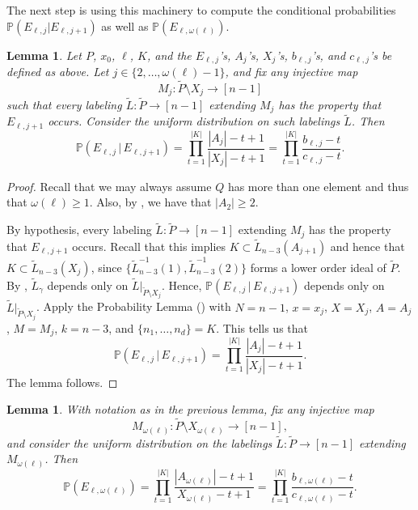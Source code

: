 \documentclass[11pt]{amsart}
\newtheorem{lemma}[thm]{Lemma}
\theoremstyle{definition}
\newcommand{\Prob}{\mathbb{P}}
\newcommand{\inverse}{^{-1}}
\begin{document}
The next step is using this machinery to compute the conditional probabilities $ \Prob(E_{\ell, j}|E_{\ell, j+1}) $ as well as $ \Prob(E_{\ell,\omega(\ell)}) $.
\begin{lemma}\label{conditional helper}
	Let $ P $, $ x_0 $, $ \ell $, $ K $, and the $ E_{\ell,j} $'s, $ A_j $'s, $ X_j $'s, $ b_{\ell,j} $'s, and $ c_{\ell,j} $'s be defined as above. Let $ j\in\{2,\ldots,\omega(\ell)-1\} $, and fix any injective map \[M_j:\tilde{P}\setminus X_j\to[n-1]\] such that every labeling $ \tilde{L}:\tilde{P}\to[n-1] $ extending $ M_j $ has the property that $ E_{\ell,j+1} $ occurs. Consider the uniform distribution on such labelings $ \tilde{L} $. Then \[\Prob(E_{\ell,j}\,|\,E_{\ell,j+1})=\prod_{t=1}^{|K|}\frac{|A_j|-t+1}{|X_j|-t+1}=\prod_{t=1}^{|K|}\frac{b_{\ell,j}-t}{c_{\ell,j}-t}.\]
\end{lemma}
\begin{proof}
	Recall that we may always assume $ Q $ has more than one element and thus that $ \omega(\ell)\geq1 $. Also, by , we have that $ |A_2|\geq2 $. 
	
	By hypothesis, every labeling $ \tilde{L}:\tilde{P}\to[n-1] $ extending $ M_j $ has the property that $ E_{\ell,j+1} $ occurs. Recall that this implies $ K\subset\tilde{L}_{n-3}(A_{j+1}) $ and hence that $ K\subset\tilde{L}_{n-3}(X_j) $, since $ \{\tilde{L}_{n-3}\inverse(1),\tilde{L}_{n-3}\inverse(2)\} $ forms a lower order ideal of $ \tilde{P} $. By , $ \tilde{L}_{\gamma} $ depends only on $ \tilde{L}|_{\tilde{P}\setminus X_j} $. Hence, $ \Prob(E_{\ell,j}\,|\,E_{\ell,j+1}) $ depends only on $ \tilde{L}|_{\tilde{P}\setminus X_j} $.  Apply the Probability Lemma () with $ N=n-1 $, $ x=x_j $, $ X=X_j $, $ A=A_j $, $ M=M_j $, $ k=n-3 $, and $ \{n_1,\ldots,n_d\}=K $. This tells us that \[\Prob(E_{\ell,j}\,|\,E_{\ell,j+1})=\prod_{t=1}^{|K|}\frac{|A_j|-t+1}{|X_j|-t+1}.\] The lemma follows.  
\end{proof}
\begin{lemma}\label{helper 1}
	With notation as in the previous lemma, fix any injective map \[M_{\omega(\ell)}:\tilde{P}\setminus X_{\omega(\ell)}\to[n-1],\] and consider the uniform distribution on the labelings $ \tilde{L}:\tilde{P}\to[n-1] $ extending $ M_{\omega(\ell)} $. Then \[\Prob(E_{\ell,\omega(\ell)})=\prod_{t=1}^{|K|}\frac{|A_{\omega(\ell)}|-t+1}{X_{\omega(\ell)}-t+1}=\prod_{t=1}^{|K|}\frac{b_{\ell,\omega(\ell)}-t}{c_{\ell,\omega(\ell)}-t}.\]
\end{lemma}
\end{document}

